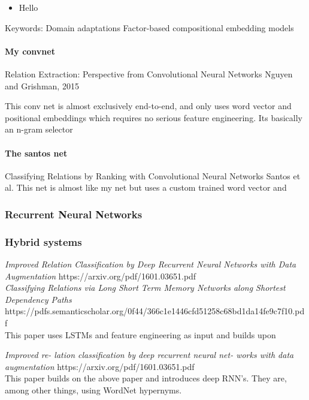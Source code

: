 \begin{itemize}
\item Hello

\end{itemize}

Keywords: 
Domain adaptations
Factor-based compositional embedding
models


\paragraph{My convnet}
Relation Extraction:
Perspective from Convolutional Neural Networks
Nguyen and Grishman, 2015

This conv net is almost exclusively end-to-end, and only uses word vector and positional 
embeddings which requires no serious feature engineering.
Its basically an n-gram selector

\paragraph{The santos net}
Classifying Relations by Ranking with Convolutional Neural Networks
Santos et al.
This net is almost like my net but uses a custom trained word vector and 

\subsubsection{Recurrent Neural Networks}

\subsubsection{Hybrid systems}

\emph{Improved Relation Classification by Deep Recurrent Neural Networks
with Data Augmentation}
https://arxiv.org/pdf/1601.03651.pdf \\

\emph{Classifying Relations via Long Short Term Memory Networks
along Shortest Dependency Paths}
https://pdfs.semanticscholar.org/0f44/366c1e1446cfd51258c68bd1da14fe9c7f10.pdf \\

This paper uses LSTMs and feature engineering as input and builds upon 

\emph{Improved re- lation classification by deep recurrent neural net- works with data augmentation}
https://arxiv.org/pdf/1601.03651.pdf \\

This paper builds on the above paper and introduces deep RNN's. They are, among other things, using WordNet hypernyms.